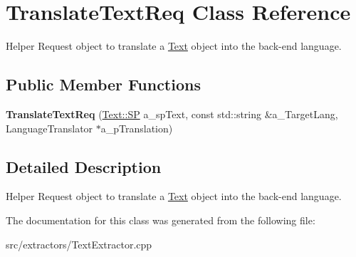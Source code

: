 \hypertarget{class_translate_text_req}{}\section{Translate\+Text\+Req Class Reference}
\label{class_translate_text_req}


Helper Request object to translate a \hyperlink{class_text}{Text} object into the back-\/end language.  


\subsection*{Public Member Functions}
\begin{DoxyCompactItemize}
\item 
\mbox{\label{class_translate_text_req_a61c8550081bc7f1d3e3c920624d0a7ed}} 
{\bfseries Translate\+Text\+Req} (\hyperlink{class_text_a35ce88bdca4f380b865b6066079230b1}{Text\+::\+SP} a\+\_\+sp\+Text, const std\+::string \&a\+\_\+\+Target\+Lang, Language\+Translator $\ast$a\+\_\+p\+Translation)
\end{DoxyCompactItemize}


\subsection{Detailed Description}
Helper Request object to translate a \hyperlink{class_text}{Text} object into the back-\/end language. 

The documentation for this class was generated from the following file\+:\begin{DoxyCompactItemize}
\item 
src/extractors/Text\+Extractor.\+cpp\end{DoxyCompactItemize}

